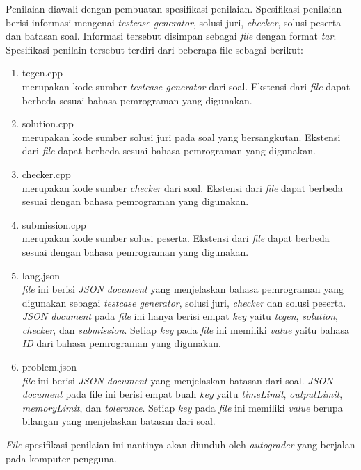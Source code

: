 \par Penilaian diawali dengan pembuatan spesifikasi penilaian. Spesifikasi penilaian berisi informasi mengenai \textit{testcase generator}, solusi juri, \textit{checker}, solusi peserta dan batasan soal. Informasi tersebut disimpan sebagai \textit{file} dengan format \textit{tar}. Spesifikasi penilain tersebut terdiri dari beberapa file sebagai berikut:
\begin{enumerate}
    \item tcgen.cpp\\ merupakan kode sumber \textit{testcase generator} dari soal. Ekstensi dari \textit{file} dapat berbeda sesuai bahasa pemrograman yang digunakan.
    \item solution.cpp\\ merupakan kode sumber  solusi juri pada soal yang bersangkutan. Ekstensi dari \textit{file} dapat berbeda sesuai bahasa pemrograman yang digunakan.
    \item checker.cpp\\ merupakan kode sumber \textit{checker} dari soal. Ekstensi dari \textit{file} dapat berbeda sesuai dengan bahasa pemrograman yang digunakan.
    \item submission.cpp\\ merupakan kode sumber solusi peserta. Ekstensi dari \textit{file} dapat berbeda sesuai dengan bahasa pemrograman yang digunakan.
    \item lang.json\\ \textit{file} ini berisi \textit{JSON document} yang menjelaskan bahasa pemrograman yang digunakan sebagai \textit{testcase generator}, solusi juri, \textit{checker} dan solusi peserta. \textit{JSON document} pada \textit{file} ini hanya berisi empat \textit{key} yaitu \textit{tcgen}, \textit{solution}, \textit{checker}, dan \textit{submission}. Setiap \textit{key} pada \textit{file} ini memiliki \textit{value} yaitu bahasa \textit{ID} dari bahasa pemrograman yang digunakan.
    \item problem.json\\ \textit{file} ini berisi \textit{JSON document} yang menjelaskan batasan dari soal. \textit{JSON document} pada file ini berisi empat buah \textit{key} yaitu \textit{timeLimit}, \textit{outputLimit}, \textit{memoryLimit}, dan \textit{tolerance}. Setiap \textit{key} pada \textit{file} ini memiliki \textit{value}  berupa bilangan yang menjelaskan batasan dari soal.
\end{enumerate}
\par \textit{File} spesifikasi penilaian ini nantinya akan diunduh oleh \textit{autograder} yang berjalan pada komputer pengguna.


